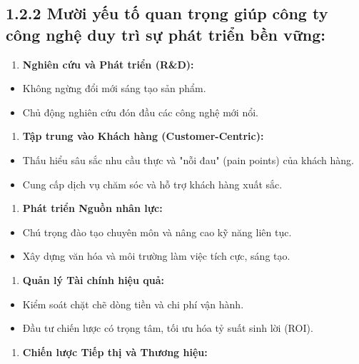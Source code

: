 \documentclass[11pt,a4paper,oneside]{report}
\begin{document}
\subsection{1.2.2 Mười yếu tố quan trọng giúp công ty công nghệ duy trì sự phát triển bền vững:}
\begin{enumerate}[leftmargin=1.5em]
\item \textbf{Nghiên cứu và Phát triển (R\&D):}
\end{enumerate}
\begin{itemize}[leftmargin=1.5em]
\item Không ngừng đổi mới sáng tạo sản phẩm.
\item Chủ động nghiên cứu đón đầu các công nghệ mới nổi.
\end{itemize}
\begin{enumerate}[leftmargin=1.5em]
\item \textbf{Tập trung vào Khách hàng (Customer-Centric):}
\end{enumerate}
\begin{itemize}[leftmargin=1.5em]
\item Thấu hiểu sâu sắc nhu cầu thực và "nỗi đau" (pain points) của khách hàng.
\item Cung cấp dịch vụ chăm sóc và hỗ trợ khách hàng xuất sắc.
\end{itemize}
\begin{enumerate}[leftmargin=1.5em]
\item \textbf{Phát triển Nguồn nhân lực:}
\end{enumerate}
\begin{itemize}[leftmargin=1.5em]
\item Chú trọng đào tạo chuyên môn và nâng cao kỹ năng liên tục.
\item Xây dựng văn hóa và môi trường làm việc tích cực, sáng tạo.
\end{itemize}
\begin{enumerate}[leftmargin=1.5em]
\item \textbf{Quản lý Tài chính hiệu quả:}
\end{enumerate}
\begin{itemize}[leftmargin=1.5em]
\item Kiểm soát chặt chẽ dòng tiền và chi phí vận hành.
\item Đầu tư chiến lược có trọng tâm, tối ưu hóa tỷ suất sinh lời (ROI).
\end{itemize}
\begin{enumerate}[leftmargin=1.5em]
\item \textbf{Chiến lược Tiếp thị và Thương hiệu:}
\end{enumerate}
\end{document}
